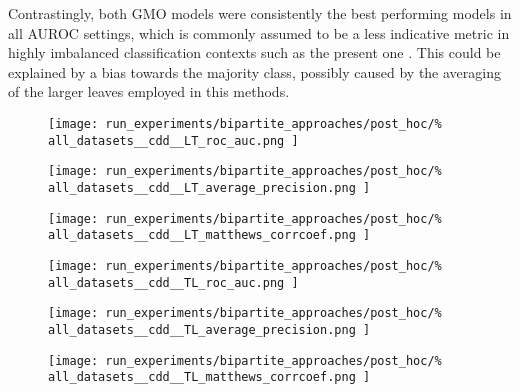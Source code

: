 Contrastingly, both GMO models were consistently the best performing models in all AUROC settings, which is commonly assumed to be a less indicative metric in highly imbalanced classification contexts such as the present one \cite{}. This could be explained by a bias towards the majority class, possibly caused by the averaging of the larger leaves employed in this methods. %

\begin{figure*}
    \centering
    \begin{subfigure}{0.32\textwidth}
        \texttt{[image: 
            run\_experiments/bipartite\_approaches/post\_hoc/\%
            all\_datasets\_\_cdd\_\_LT\_roc\_auc.png
        ]}
    \end{subfigure}
    \begin{subfigure}{0.32\textwidth}
        \texttt{[image: 
            run\_experiments/bipartite\_approaches/post\_hoc/\%
            all\_datasets\_\_cdd\_\_LT\_average\_precision.png
        ]}
    \end{subfigure}
    \begin{subfigure}{0.32\textwidth}
        \texttt{[image: 
            run\_experiments/bipartite\_approaches/post\_hoc/\%
            all\_datasets\_\_cdd\_\_LT\_matthews\_corrcoef.png
        ]}
    \end{subfigure}

    \begin{subfigure}{0.32\textwidth}
        \texttt{[image: 
            run\_experiments/bipartite\_approaches/post\_hoc/\%
            all\_datasets\_\_cdd\_\_TL\_roc\_auc.png
        ]}
    \end{subfigure}
    \begin{subfigure}{0.32\textwidth}
        \texttt{[image: 
            run\_experiments/bipartite\_approaches/post\_hoc/\%
            all\_datasets\_\_cdd\_\_TL\_average\_precision.png
        ]}
    \end{subfigure}
    \begin{subfigure}{0.32\textwidth}
        \texttt{[image: 
            run\_experiments/bipartite\_approaches/post\_hoc/\%
            all\_datasets\_\_cdd\_\_TL\_matthews\_corrcoef.png
        ]}
    \end{subfigure}


\end{figure*}
